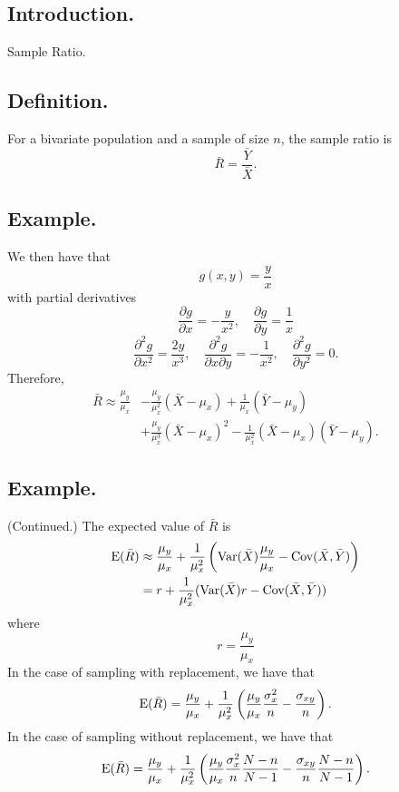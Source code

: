 \documentclass[titlepage]{article}
\begin{document}
\newpage {}

\subsection{Introduction.} Sample Ratio.

\subsection{Definition.} For a bivariate population and a sample of size $n$, the sample ratio is 
$$\bar{R} = \frac{\bar{Y}}{\bar{X}}.$$

\subsection{Example.} We then have that 
$$g(x, y) = \frac{y}{x}$$
with partial derivatives 
$$\frac{\partial g}{\partial x} = -\frac{y}{x^{2}}, \quad \frac{\partial g}{\partial y} = \frac{1}{x}$$
$$\frac{\partial^{2} g}{\partial x^{2}} = \frac{2y}{x^{3}}, \quad \frac{\partial^{2} g}{\partial x \partial y} = -\frac{1}{x^{2}}, \quad \frac{\partial^{2} g}{\partial y^{2}} = 0.$$
Therefore, 
\begin{align*}
    \bar{R} \approx \frac{\mu_{y}}{\mu_{x}} &- \frac{\mu_{y}}{\mu_{x}^{2}}(\bar{X} - \mu_{x}) + \frac{1}{\mu_{x}}(\bar{Y} - \mu_{y}) \\
                                            &+ \frac{\mu_{y}}{\mu_{x}^{3}}(\bar{X} - \mu_{x})^{2} - \frac{1}{\mu_{x}^{2}}(\bar{X} - \mu_{x})(\bar{Y} - \mu_{y}).
\end{align*}

\subsection{Example.} (Continued.) The expected value of $\bar{R}$ is 
\begin{align*}
    \text{E}(\bar{R}) &\approx \frac{\mu_{y}}{\mu_{x}} + \frac{1}{\mu_{x}^{2}}\left(\text{Var}(\bar{X})\frac{\mu_{y}}{\mu_{x}} - \text{Cov}(\bar{X}, \bar{Y})\right) \\
                &= r + \frac{1}{\mu_{x}^{2}}(\text{Var}(\bar{X})r - \text{Cov}(\bar{X}, \bar{Y}))
\end{align*}
where 
$$r = \frac{\mu_{y}}{\mu_{x}}$$
In the case of sampling with replacement, we have that
$$\text{E}(\bar{R}) = \frac{\mu_{y}}{\mu_{x}} + \frac{1}{\mu_{x}^{2}}\left(\frac{\mu_{y}}{\mu_{x}}\frac{\sigma_{x}^{2}}{n} - \frac{\sigma_{xy}}{n}\right).$$
In the case of sampling without replacement, we have that 
$$\text{E}(\bar{R}) = \frac{\mu_{y}}{\mu_{x}} + \frac{1}{\mu_{x}^{2}}\left(\frac{\mu_{y}}{\mu_{x}}\frac{\sigma_{x}^{2}}{n}\frac{N - n}{N - 1} - \frac{\sigma_{xy}}{n}\frac{N - n}{N - 1}\right).$$
\end{document}
